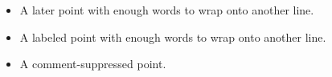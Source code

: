 \begin{itemize}
\item<2-> A later point with enough words to wrap onto another line.
\item <3->[Note] A labeled point with enough words to wrap onto another line.
\item<4->%
A comment-suppressed point.
\end{itemize}
